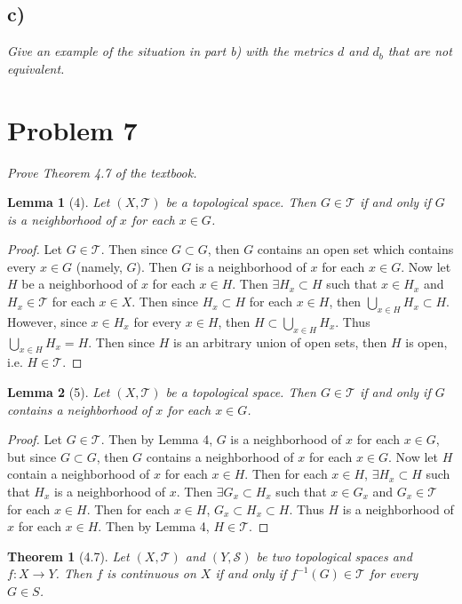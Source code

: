 \documentclass[12pt]{article}
\theoremstyle{plain}
\newtheorem*{theorem*}{Theorem}
\newtheorem*{lemma*}{Lemma}
\begin{document}
\subsection*{ c)}
\emph{Give an example of the situation in part b) with the metrics $d$ and $d_b$ that are \emph{not} equivalent.}

\section*{Problem 7}
\emph{Prove Theorem 4.7 of the textbook.}

\begin{lemma*}[4]
    Let $(X, \mathcal{T})$ be a topological space.  Then $G \in \mathcal{T}$ if and only if $G$ is a neighborhood of $x$ for each $x \in G$.
\end{lemma*}
\begin{proof}
    Let $G\in\mathcal{T}$.  Then since $G \subset G$, then $G$ contains an open set which contains every $x \in G$ (namely, $G$).  Then $G$ is a neighborhood of $x$ for each $x \in G$.  Now let $H$ be a neighborhood of $x$ for each $x \in H$.  Then $\exists H_x \subset H$ such that $x \in H_x$ and $H_x \in \mathcal{T}$ for each $x \in X$.  Then since $H_x \subset H$ for each $x \in H$, then $\bigcup_{x\in H} H_x \subset H$.  However, since $x \in H_x$ for every $x \in H$, then $H \subset \bigcup_{x\in H} H_x$.  Thus $\bigcup_{x\in H} H_x = H$.  Then since $H$ is an arbitrary union of open sets, then $H$ is open, i.e. $H \in \mathcal{T}$.
\end{proof}
\begin{lemma*}[5]
    Let $(X, \mathcal{T})$ be a topological space.  Then $G \in \mathcal{T}$ if and only if $G$ contains a neighborhood of $x$ for each $x \in G$.
\end{lemma*}
\begin{proof}
    Let $G\in\mathcal{T}$.  Then by Lemma 4, $G$ is a neighborhood of $x$ for each $x \in G$, but since $G \subset G$, then $G$ contains a neighborhood of $x$ for each $x \in G$.  Now let $H$ contain a neighborhood of $x$ for each $x \in H$.  Then for each $x \in H$, $\exists H_x \subset H$ such that $H_x$ is a neighborhood of $x$.  Then $\exists G_x \subset H_x$ such that $x\in G_x$ and $G_x \in \mathcal{T}$ for each $x \in H$.  Then for each $x \in H$, $G_x \subset H_x \subset H$.  Thus $H$ is a neighborhood of $x$ for each $x \in H$.  Then by Lemma 4, $H \in \mathcal{T}$.
\end{proof}
\begin{theorem*}[4.7]
    Let $(X, \mathcal{T})$ and $(Y, \mathcal{S})$ be two topological spaces and $f: X \rightarrow Y$.  Then $f$ is continuous on $X$ if and only if $f^{-1}(G) \in \mathcal{T}$ for every $G \in S$.
\end{theorem*}
\end{document}
